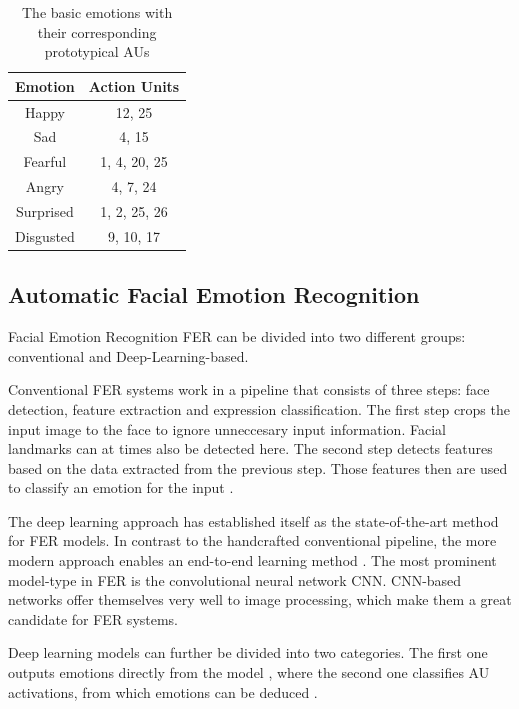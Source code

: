 \begin{table}[]
    \centering
    \begin{tabular}{c|c}
       \textbf{Emotion}  & \textbf{Action Units} \\ \hline
        Happy & 12, 25 \\
        Sad & 4, 15 \\
        Fearful & 1, 4, 20, 25 \\
        Angry & 4, 7, 24 \\
        Surprised & 1, 2, 25, 26 \\
        Disgusted & 9, 10, 17
    \end{tabular}
    \caption{The basic emotions with their corresponding prototypical AUs \cite{fabian2016emotionet}}
    \label{tab:emotionAUs}
\end{table}

\subsection{Automatic Facial Emotion Recognition}
Facial Emotion Recognition FER can be divided into two different groups: conventional and Deep-Learning-based. \cite{ko2018brief}

Conventional FER systems work in a pipeline that consists of three steps: face detection, feature extraction and expression classification. The first step crops the input image to the face to ignore unneccesary input information. Facial landmarks can at times also be detected here. The second step detects features based on the data extracted from the previous step. Those features then are used to classify an emotion for the input \cite{ko2018brief}.

The deep learning approach has established itself as the state-of-the-art method for FER models. In contrast to the handcrafted conventional pipeline, the more modern approach enables an end-to-end learning method \cite{ko2018brief}. The most prominent model-type in FER is the convolutional neural network CNN. CNN-based networks offer themselves very well to image processing, which make them a great candidate for FER systems. 

Deep learning models can further be divided into two categories. The first one outputs emotions directly from the model \cite{ebrahimi2015recurrent} \cite{kim2017multi} \cite{jung2015joint}, where the second one classifies AU activations, from which emotions can be deduced \cite{breuer2017deep} \cite{zhao2016deep} \cite{chu2017learning}. 

